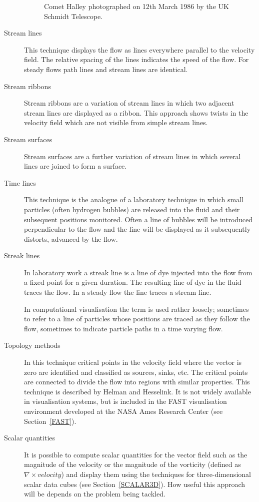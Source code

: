 \begin{description}
\begin{figure}[htbp]
  \caption[Comet Halley.]{Comet Halley photographed on 12th March 1986
   by the UK Schmidt Telescope. \label{HALLEY} }

  \end{figure}

  \item[Stream lines] This technique displays the flow as lines
   everywhere parallel to the velocity field. The relative spacing
   of the lines indicates the speed of the flow. For steady flows
   path lines and stream lines are identical.

  \item[Stream ribbons] Stream ribbons are a variation of stream lines
   in which two adjacent stream lines are displayed as a ribbon. This
   approach shows twists in the velocity field which are not visible
   from simple stream lines.

  \item[Stream surfaces] Stream surfaces are a further variation of
   stream lines in which several lines are joined to form a surface.

  \item[Time lines] This technique is the analogue of a laboratory
   technique in which small particles (often hydrogen bubbles) are
   released into the fluid and their subsequent positions monitored.
   Often a line of bubbles will be introduced perpendicular to the
   flow and the line will be displayed as it subsequently distorts,
   advanced by the flow.

  \item[Streak lines] In laboratory work a streak line is a line of
   dye injected into the flow from a fixed point for a given duration.
   The resulting line of dye in the fluid traces the flow. In a
   steady flow the line traces a stream line.

   In computational visualisation the term is used rather loosely;
   sometimes to refer to a line of particles whose positions are traced
   as they follow the flow, sometimes to indicate particle paths in a
   time varying flow.

  \item[Topology methods] In this technique critical points in the
   velocity field where the vector is zero are identified and
   classified as sources, sinks, etc. The critical points are connected
   to divide the flow into regions with similar properties. This
   technique is described by Helman and Hesselink\cite{HELMAN}. It is
   not widely available in visualisation systems, but is included in
   the FAST visualisation environment developed at the NASA Ames
   Research Center (see Section~\ref{FAST}).

  \item[Scalar quantities] It is possible to compute scalar quantities
   for the vector field such as the magnitude of the velocity or the
   magnitude of the vorticity (defined as $\nabla  \times velocity$)
   and display them using the techniques for three-dimensional scalar
   data cubes (see Section~\ref{SCALAR3D}). How useful this approach
   will be depends on the problem being tackled.

\end{description}


